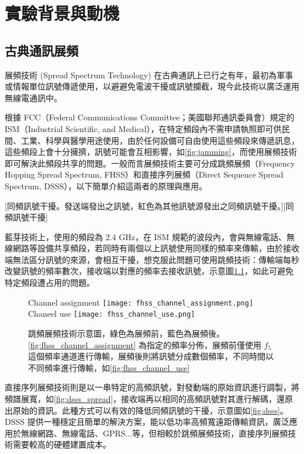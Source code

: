 \documentclass[class=NCU_thesis, crop=false]{standalone}
\begin{document}
\chapter{實驗背景與動機}
\section{古典通訊展頻}
展頻技術 (Spread Spectrum Technology) 在古典通訊上已行之有年，最初為軍事或情報單位訊號傳遞使用，以避避免電波干擾或訊號攔截，現今此技術以廣泛運用無線電通訊中。

根據 FCC（Federal Communications Committee；美國聯邦通訊委員會）規定的 ISM（Industrial Scientific, and Medical），在特定頻段內不需申請執照即可供民間、工業、科學與醫學用途使用，由於任何設備可自由使用這些頻段來傳遞訊息，這些頻段上會十分擁擠，訊號可能會互相影響，如\cref{fig:jamming}，而使用展頻技術即可解決此頻段共享的問題。一般而言展頻技術主要可分成跳頻展頻（Frequency Hopping Spread Spectrum, FHSS）和直接序列展頻（Direct Sequence Spread Spectrum, DSSS），以下簡單介紹這兩者的原理與應用。


[同頻訊號干擾。發送端發出之訊號，紅色為其他訊號源發出之同頻訊號干擾。][同頻訊號干擾]

藍芽技術上，使用的頻段為 2.4 GHz，在 ISM 規範的波段內，會與無線電話、無線網路等設備共享頻段，若同時有兩個以上訊號使用同樣的頻率來傳輸，由於接收端無法區分訊號的來源，會相互干擾，想克服此問題可使用跳頻技術：傳輸端每秒改變訊號的頻率數次，接收端以對應的頻率去接收訊號，示意圖\cref{fig:fhss}，如此可避免特定頻段遭占用的問題。

\begin{figure}[!hbt]
    \centering
    \subcaptionbox
        {Channel assignment
        \label{fig:fhss_channel_assignment}}
        {\texttt{[image: fhss\_channel\_assignment.png]}}
    ~~~~
    \subcaptionbox
        {Chaneel use
        \label{fig:fhss_channel_use}}
        {\texttt{[image: fhss\_channel\_use.png]}}
    \caption[跳頻展頻技術示意圖]{跳頻展頻技術示意圖，綠色為展頻前，藍色為展頻後。\cref{fig:fhss_channel_assignment} 為指定的頻率分佈，展頻前僅使用 $f_5$ 這個頻率通道進行傳輸，展頻後則將訊號分成數個頻率，不同時間以不同頻率進行傳輸，如\cref{fig:fhss_channel_use}}
    \label{fig:fhss}
\end{figure}

直接序列展頻技術則是以一串特定的高頻訊號，對發動端的原始資訊進行調製，將頻譜展寬，如\cref{fig:dsss_spread}，接收端再以相同的高頻訊號對其進行解碼，還原出原始的資訊。此種方式可以有效的降低同頻訊號的干擾，示意圖如\cref{fig:dsss}。DSSS 提供一種穩定且簡單的解決方案，能以低功率高頻寬遠距傳輸資訊，廣泛應用於無線網路、無線電話、GPRS...等，但相較於跳頻展頻技術，直接序列展頻技術需要較高的硬體建置成本。
\end{document}
